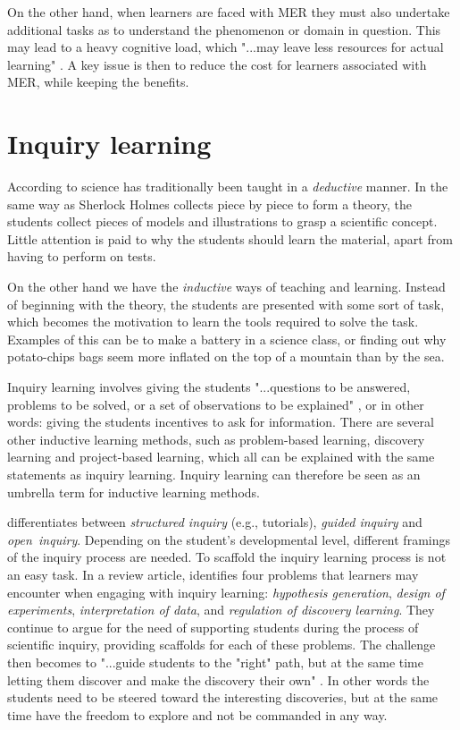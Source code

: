 On the other hand, when learners are faced with MER they must also undertake additional tasks as to understand the phenomenon or domain in question. This may lead to a heavy cognitive load, which "...may leave less resources for actual learning" \citetext{\citealp{sweller1988cognitive,sweller1989cognitive}, referenced in \citealp{van2006supporting}, p. 200}. A key issue is then to reduce the cost for learners associated with MER, while keeping the benefits. 

\section{Inquiry learning}
According to \citet{prince2006inductive} science has traditionally been taught in a \textit{deductive} manner. In the same way as Sherlock Holmes collects piece by piece to form a theory, the students collect pieces of models and illustrations to grasp a scientific concept. Little attention is paid to why the students should learn the material, apart from having to perform on tests.

On the other hand we have the \textit{inductive} ways of teaching and learning. Instead of beginning with the theory, the students are presented with some sort of task, which becomes the motivation to learn the tools required to solve the task. Examples of this can be to make a battery in a science class, or finding out why potato-chips bags seem more inflated on the top of a mountain than by the sea.

Inquiry learning involves giving the students "...questions to be answered, problems to be solved, or a set of observations to be explained" \citep[p. 127]{prince2006inductive}, or in other words: giving the students incentives to ask for information. There are several other inductive learning methods, such as problem-based learning, discovery learning and project-based learning, which all can be explained with the same statements as inquiry learning. Inquiry learning can therefore be seen as an umbrella term for inductive learning methods. \citep{prince2006inductive}

\citeauthor*{staver1987analysis} \citetext{\citeyear{staver1987analysis}, referenced in \citealp{prince2006inductive}} differentiates between \emph{structured inquiry} (e.g., tutorials), \emph{guided inquiry} and \emph{open~inquiry}. Depending on the student's developmental level, different framings of the inquiry process are needed. To scaffold the inquiry learning process is not an easy task. In a review article, \citet{de1998scientific} identifies four problems that learners may encounter when engaging with inquiry learning: \textit{hypothesis generation}, \textit{design of experiments}, \textit{interpretation of data}, and \textit{regulation of discovery learning}. They continue to argue for the need of supporting students during the process of scientific inquiry, providing scaffolds for each of these problems. The challenge then becomes to "...guide students to the "right" path, but at the
same time letting them discover and make the discovery their own" \citep[p. 247]{kluge2010simulation}. In other words the students need to be steered toward the interesting discoveries, but at the same time have the freedom to explore and not be commanded in any way.

